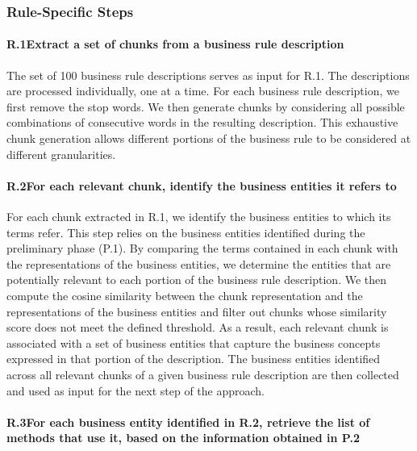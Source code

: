 \subsubsection{Rule-Specific Steps}\noindent

\vspace{-0.5em}

\paragraph{R.1\quad Extract a set of chunks from a business rule description}\noindent

\vspace{-0.1em}

The set of 100 business rule descriptions serves as input for R.1. The descriptions are processed individually, one at a time. For each business rule description, we first remove the stop words. We then generate chunks by considering all possible combinations of consecutive words in the resulting description. This exhaustive chunk generation allows different portions of the business rule to be considered at different granularities.

\paragraph{R.2\quad For each relevant chunk, identify the business entities it refers to}\noindent

\vspace{-0.1em}

For each chunk extracted in R.1, we identify the business entities to which its terms refer. This step relies on the business entities identified during the preliminary phase (P.1). By comparing the terms contained in each chunk with the representations of the business entities, we determine the entities that are potentially relevant to each portion of the business rule description. We then compute the cosine similarity between the chunk representation and the representations of the business entities and filter out chunks whose similarity score does not meet the defined threshold. As a result, each relevant chunk is associated with a set of business entities that capture the business concepts expressed in that portion of the description. The business entities identified across all relevant chunks of a given business rule description are then collected and used as input for the next step of the approach.

\paragraph{R.3\quad For each business entity identified in R.2, retrieve the list of methods that use it, based on the information obtained in P.2}\noindent

